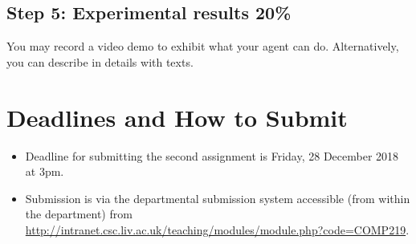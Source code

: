 \documentclass[12pt,a4]{article}
\begin{document}
\subsection*{Step 5: Experimental results 20\%}

You may record a video demo to exhibit what your agent can do. Alternatively, you can describe in details with texts.  

\section{Deadlines and How to Submit}
\begin{itemize}
\item Deadline for submitting the second assignment is Friday, 28 December 2018 at
3pm.

\item Submission is via the departmental submission system accessible
(from within the department) from \\
\url{http://intranet.csc.liv.ac.uk/teaching/modules/module.php?code=COMP219}.\\




\end{itemize}
\end{document}
